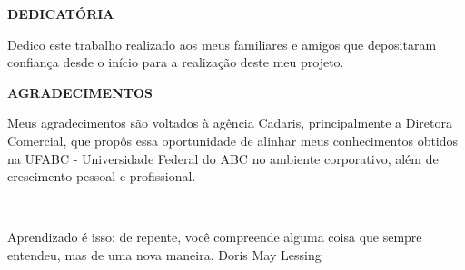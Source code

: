 \documentclass[
  12pt,				%
  openany,
  oneside,
  a4paper,			%
  english,			%
  brazil
]{article}
\numberwithin{figure}{section}
\numberwithin{table}{section}
\begin{document}

\begin{titlepage}

\begin{center}
\textbf{DEDICATÓRIA}
\end{center}

Dedico este trabalho realizado aos meus familiares e amigos que depositaram confiança desde o início para a realização deste meu projeto.

\end{titlepage}


\begin{titlepage}

\begin{center}
\textbf{AGRADECIMENTOS}
\end{center}

Meus agradecimentos são voltados à agência Cadaris, principalmente a Diretora Comercial, que propôs essa oportunidade de alinhar meus conhecimentos obtidos na UFABC - Universidade Federal do ABC no ambiente corporativo, além de crescimento pessoal e profissional.

\end{titlepage}


\begin{titlepage}
~\\\vspace{18cm}
\begin{raggedleft}

\begin{epigraph}
  {Aprendizado é isso: de repente, você compreende alguma coisa que sempre entendeu, mas de uma nova maneira.}
  {Doris May Lessing}
\end{epigraph}

\end{raggedleft}

\end{titlepage}

\end{document}
